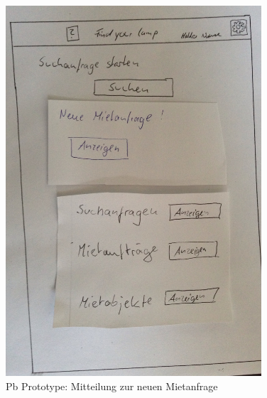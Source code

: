 \begin{figure}[H]
\centering
\includegraphics[angle=90, width=0.85\textwidth]{./images/paperbased/neueMietanfrage.JPG}
\caption{Pb Prototype: Mitteilung zur neuen Mietanfrage}
\label{pbprototype8}
\end{figure}

